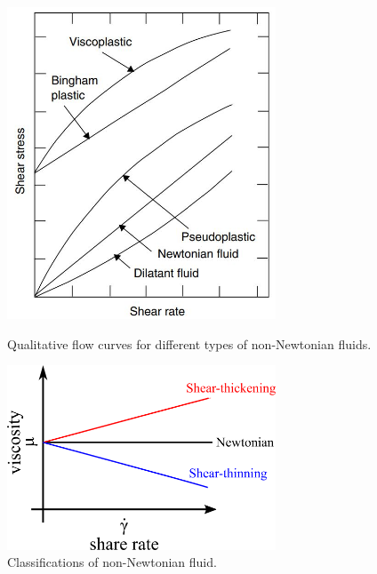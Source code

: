 \begin{center}
    \begin{figure}[h]
        \centering
        \includegraphics[width=8.0cm,clip]{1-Background/1-fluid-curve.jpg}
        \caption{Qualitative flow curves for different types of non-Newtonian fluids\cite{ref:1}.}
        \label{fig:1-fluid-curve}
        \centering
        \includegraphics[width=8.0cm,clip]{1-Background/2-Newton-fluid.png}
        \caption{Classifications of non-Newtonian fluid.}
        \label{fig:2-Newton-fluid}
    \end{figure}


\end{center}
